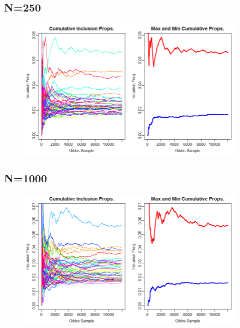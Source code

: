 \documentclass[12pt]{article}
\begin{document}
\subsection*{N=250}
\begin{figure}[H]
\centerline{\includegraphics[scale=.52]{sq8_n250}}
\end{figure}

\subsection*{N=1000}
\begin{figure}[H]
\centerline{\includegraphics[scale=.52]{sq8_n1000}}

\end{figure}
\end{document}
